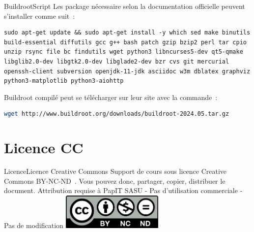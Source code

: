 \documentclass{beamer}
\begin{document}
    \begin{frame}[fragile]{Buildroot}{Script}
        Les package nécessaire selon la documentation officielle peuvent s'installer comme suit~:
        \begin{lstlisting}
sudo apt-get update && sudo apt-get install -y which sed make binutils build-essential diffutils gcc g++ bash patch gzip bzip2 perl tar cpio unzip rsync file bc findutils wget python3 libncurses5-dev qt5-qmake libglib2.0-dev libgtk2.0-dev libglade2-dev bzr cvs git mercurial openssh-client subversion openjdk-11-jdk asciidoc w3m dblatex graphviz python3-matplotlib python3-aiohttp
        \end{lstlisting}
        Buildroot compilé peut se télécharger sur leur site avec la commande~:
        \begin{lstlisting}[language=bash]
wget http://www.buildroot.org/downloads/buildroot-2024.05.tar.gz
        \end{lstlisting}
    \end{frame}


    \section{Licence CC}\label{sec:licence}

    \begin{frame}{Licence}{Licence Creative Commons}
        Support de cours sous licence Creative Commons BY-NC-ND~.
        \bigbreak
        Vous pouvez donc, partager, copier, distribuer le document.
        \bigbreak
        Attribution requise à PapIT SASU - Pas d’utilisation commerciale - Pas de modification
        \bigbreak
        \centering
        \includegraphics[width=5cm]{image/by-nc-nd-logo}
    \end{frame}
\end{document}
